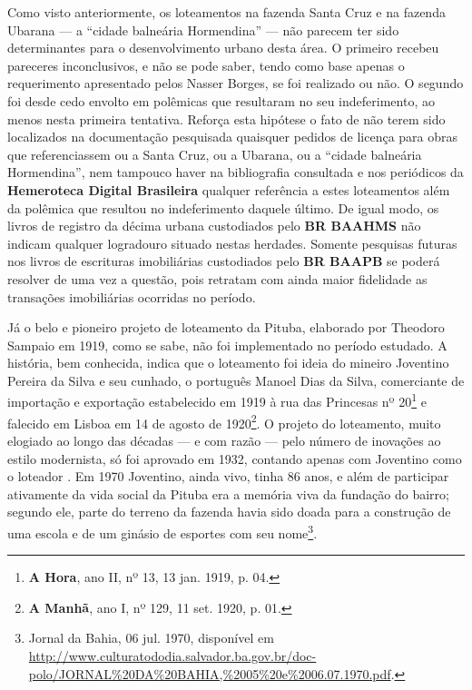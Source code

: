 Como visto anteriormente, os loteamentos na fazenda Santa Cruz e na fazenda Ubarana --- a ``cidade balneária Hormendina'' --- não parecem ter sido determinantes para o desenvolvimento urbano desta área. O primeiro recebeu pareceres inconclusivos, e não se pode saber, tendo como base apenas o requerimento apresentado pelos Nasser Borges, se foi realizado ou não. O segundo foi desde cedo envolto em polêmicas que resultaram no seu indeferimento, ao menos nesta primeira tentativa. Reforça esta hipótese o fato de não terem sido localizados na documentação pesquisada quaisquer pedidos de licença para obras que referenciassem ou a Santa Cruz, ou a Ubarana, ou a ``cidade balneária Hormendina'', nem tampouco haver na bibliografia consultada e nos periódicos da \textbf{Hemeroteca Digital Brasileira} qualquer referência a estes loteamentos além da polêmica que resultou no indeferimento daquele último. De igual modo, os livros de registro da décima urbana custodiados pelo \textbf{BR BAAHMS} não indicam qualquer logradouro situado nestas herdades. Somente pesquisas futuras nos livros de escrituras imobiliárias custodiados pelo \textbf{BR BAAPB} se poderá resolver de uma vez a questão, pois retratam com ainda maior fidelidade as transações imobiliárias ocorridas no período.

Já o belo e pioneiro projeto de loteamento da Pituba, elaborado por Theodoro Sampaio em 1919, como se sabe, não foi implementado no período estudado. A história, bem conhecida, indica que o loteamento foi ideia do mineiro Joventino Pereira da Silva e seu cunhado, o português Manoel Dias da Silva, comerciante de importação e exportação estabelecido em 1919 à rua das Princesas nº 20\footnote{\textbf{A Hora}, ano II, nº 13, 13 jan. 1919, p. 04.} e falecido em Lisboa em 14 de agosto de 1920\footnote{\textbf{A Manhã}, ano I, nº 129, 11 set. 1920, p. 01.}. O projeto do loteamento, muito elogiado ao longo das décadas --- e com razão --- pelo número de inovações ao estilo modernista, só foi aprovado em 1932, contando apenas com Joventino como o loteador \cite{leme_urbanismo_1999,santos_theodoro_2010}. Em 1970 Joventino, ainda vivo, tinha 86 anos, e além de participar ativamente da vida social da Pituba era a memória viva da fundação do bairro; segundo ele, parte do terreno da fazenda havia sido doada para a construção de uma escola e de um ginásio de esportes com seu nome\footnote{Jornal da Bahia, 06 jul. 1970, disponível em \url{http://www.culturatododia.salvador.ba.gov.br/doc-polo/JORNAL\%20DA\%20BAHIA,\%2005\%20e\%2006.07.1970.pdf}.}. 

